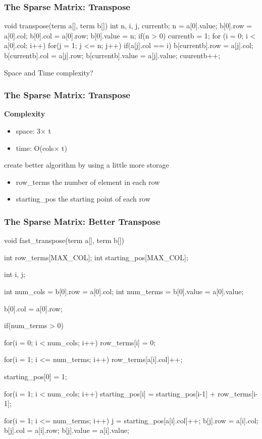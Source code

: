 \documentclass[newPxFont,sthlmFooter,nooffset]{beamer}
\begin{document}
\begin{frame}[t, fragile]
  \frametitle{The Sparse Matrix: Transpose}
\begin{codedef}
void transpose(term a[], term b[]) {
    int n, i, j, currentb;
    n = a[0].value; 
    b[0].row = a[0].col;
    b[0].col = a[0].row; 
    b[0].value = n;
    if(n > 0){
        currentb = 1;
        for (i = 0; i < a[0].col; i++)
            for(j = 1; j <= n; j++)
                if(a[j].col == i) {
                  b[currentb].row = a[j].col;  
                  b[currentb].col = a[j].row;  
                  b[currentb].value = a[j].value;  
                  cuurentb++;
            }
    }
}
\end{codedef}
Space and Time complexity?
\end{frame}

\begin{frame}[t, fragile]
  \frametitle{The Sparse Matrix: Transpose}
\textbf{Complexity}
\begin{itemize}
\item space: 3$\times$ t
\item time: O(cols$\times$ t)
\end{itemize}

create better algorithm by using a little more storage
\begin{itemize}
\item row\_terms the number of element in each row
\item starting\_pos the starting point of each row
\end{itemize}

\end{frame}

\begin{frame}
  \frametitle{The Sparse Matrix: Better Transpose}
\begin{codedef}
void fast_transpose(term a[], term b[]){
    int row_terms[MAX_COL];
    int starting_pos[MAX_COL];
    
    int i, j;
    
    int num_cols = b[0].row = a[0].col;
    int num_terms = b[0].value = a[0].value;

    b[0].col = a[0].row;

    if(num_terms > 0) {
        for(i = 0; i < num_cols; i++)
            row_terms[i] = 0;

        for(i = 1; i <= num_terms; i++)
            row_terms[a[i].col]++;

        starting_pos[0] = 1;

        for(i = 1; i < num_cols; i++)
            starting_pos[i] = starting_pos[i-1] + row_terms[i-1];

        for(i = 1; i <= num_terms; i++){
            j = starting_pos[a[i].col]++;
            b[j].row = a[i].col;
            b[j].col = a[i].row;
            b[j].value = a[i].value;
        }
    }
}  
\end{codedef}
\end{frame}
\end{document}

